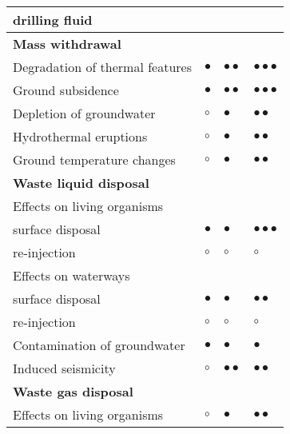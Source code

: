 \documentclass[12pts,a4paper,amsmath,amssymb,floatfix]{article}%
\begin{document}
\begin{enumerate}[label=\bfseries Problem \arabic*]
\begin{table}[h]
\begin{center}
\begin{tabular}{l | l | l | l }
    \;\;\;drilling fluid               &                      &                              &                   \\
    \hline
    \multirow{1}{*}{\bf Mass withdrawal} \\
    \hline
    Degradation of thermal features    & $\bullet$            & $\bullet\bullet$             & $\bullet\bullet\bullet$ \\
    Ground subsidence                  & $\bullet$            & $\bullet\bullet$             & $\bullet\bullet\bullet$  \\
    Depletion of groundwater           & $\circ$              & $\bullet$                    & $\bullet\bullet$         \\
    Hydrothermal eruptions             & $\circ$              & $\bullet$                    & $\bullet\bullet$         \\
    Ground temperature changes         & $\circ$              & $\bullet$                    & $\bullet\bullet$         \\
    \hline
    \multirow{1}{*}{\bf Waste liquid disposal} \\
    \hline
    Effects on living organisms        &                      &                              &                         \\
    \;\;\;surface disposal             & $\bullet$            & $\bullet$                    & $\bullet\bullet\bullet$ \\
    \;\;\; re-injection                & $\circ$              & $\circ$                      & $\circ$                 \\
    Effects on waterways               &                      &                              &                         \\
    \;\;\;surface disposal             & $\bullet$            & $\bullet$                    & $\bullet\bullet$        \\
    \;\;\; re-injection                & $\circ$              & $\circ$                      & $\circ$                 \\
    Contamination of groundwater       & $\bullet$            & $\bullet$                    & $\bullet$               \\
    Induced seismicity                 & $\circ$              & $\bullet\bullet$             & $\bullet\bullet$        \\
    \hline
    \multirow{1}{*}{\bf Waste gas disposal} \\
    \hline
    Effects on living organisms        & $\circ$              & $\bullet$                    & $\bullet\bullet$         \\

\end{tabular}
\end{center}
\end{table}
\end{enumerate}
\end{document}
